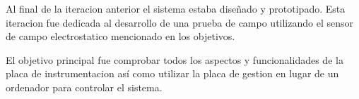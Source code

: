 Al final de la iteracion anterior el sistema estaba diseñado y prototipado. Esta iteracion fue dedicada al desarrollo de una prueba de campo utilizando el sensor de campo electrostatico mencionado en los objetivos. 

El objetivo principal fue comprobar todos los aspectos y funcionalidades de la placa de instrumentacion así como utilizar la placa de gestion en lugar de un ordenador para controlar el sistema.











